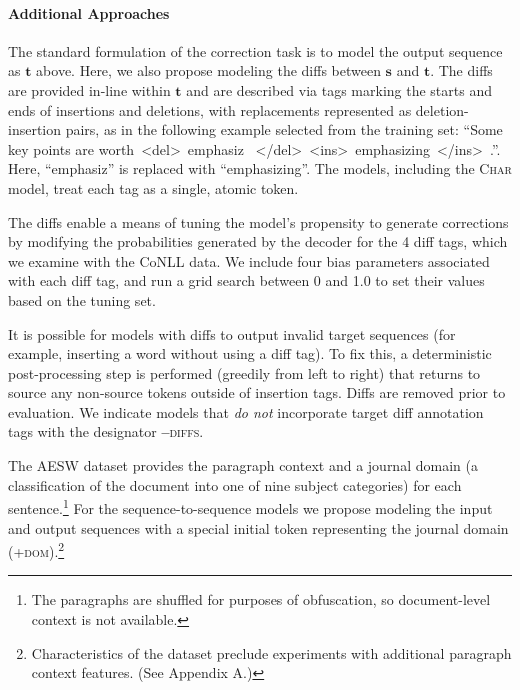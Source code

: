 \documentclass[11pt,letterpaper]{article}
\begin{document}
\paragraph{Additional Approaches}

The standard formulation of the correction task is to model the output sequence as $\mathbf{t}$ above. Here, we also propose modeling the diffs between $\mathbf{s}$ and $\mathbf{t}$. The diffs are provided in-line within $\mathbf{t}$ and are described via tags marking the starts and ends of insertions and deletions, with replacements represented as deletion-insertion pairs, as in the following example selected from the training set:  ``Some key points are worth~\textless del\textgreater~emphasiz~ \textless /del\textgreater ~\textless ins\textgreater~emphasizing~\textless /ins\textgreater~.''. Here, ``emphasiz'' is replaced with ``emphasizing''. The models, including the \textsc{Char} model, treat each tag as a single, atomic token. 

The diffs enable a means of tuning the model's propensity to generate corrections by modifying the probabilities generated by the decoder for the 4 diff tags, which we examine with the CoNLL data. We include four bias parameters associated with each diff tag, and run a grid search between 0 and 1.0 to set their values based on the tuning set.

It is possible for models with diffs to output invalid target sequences (for example, inserting a word without using a diff tag). To fix this, a deterministic post-processing step is performed (greedily from left to right) that returns to source any non-source tokens outside of insertion tags. Diffs are removed prior to evaluation. We indicate models that \textit{do not} incorporate target diff annotation tags with the designator \textsc{\textbf{--}diffs}.

The AESW dataset provides the paragraph context and a journal domain (a classification of the document into one of nine subject categories) for each sentence.\footnote{The paragraphs are shuffled for purposes of obfuscation, 
so document-level context is not available.} For the sequence-to-sequence models we propose modeling the input and output sequences with a special initial token representing the journal domain (\textsc{+dom}).\footnote{Characteristics of the dataset preclude experiments with additional paragraph context features. (See Appendix A.)} 
\end{document}
